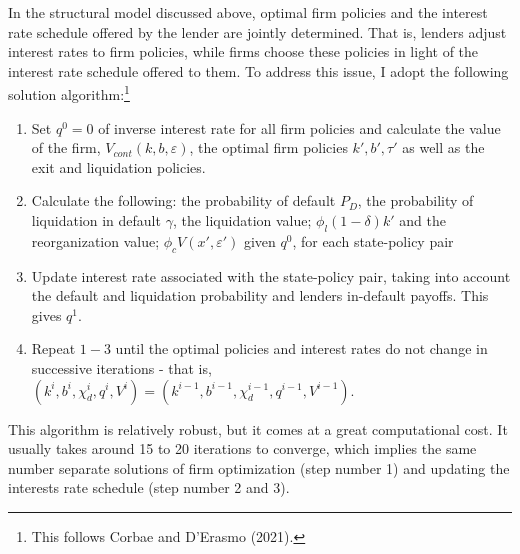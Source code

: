 \documentclass[12pt]{article}
\begin{document}
In the structural model discussed above, optimal firm policies and the interest rate schedule offered by the lender are jointly determined. That is, lenders adjust interest rates to firm policies, while firms choose these policies in light of the interest rate schedule offered to them. To address this issue, I adopt the following solution algorithm:\footnote{This follows Corbae and D'Erasmo (2021).}
\begin{enumerate}
    \item Set $q^0 = 0$ of inverse interest rate for all firm policies and calculate the value of the firm, $V_{cont}(k,b,\varepsilon)$, the optimal firm policies $k', b', \tau'$ as well as the exit and liquidation policies. 
    \item Calculate the following: the probability of default $P_D$, the probability of liquidation in default $\gamma$, the liquidation value; $\phi_l (1-\delta) k'$ and the reorganization value; $\phi_c V (x', \varepsilon')$ given $q^0$, for each state-policy pair
    \item Update interest rate associated with the state-policy pair, taking into account the default and liquidation probability and lenders in-default payoffs. This gives $q^1$. 
    \item Repeat $1-3$ until the optimal policies and interest rates do not change in successive iterations - that is, $ (k^{i},b^{i},\chi_d^{i},q^{i}, V^{i}) = (k^{i-1},b^{i-1},\chi_d^{i-1}, q^{i-1}, V^{i-1}) $.
\end{enumerate}
This algorithm is relatively robust, but it comes at a great computational cost. It usually takes around 15 to 20 iterations to converge, which implies the same number separate solutions of firm optimization (step number 1) and updating the interests rate schedule (step number 2 and 3). 
\end{document}
